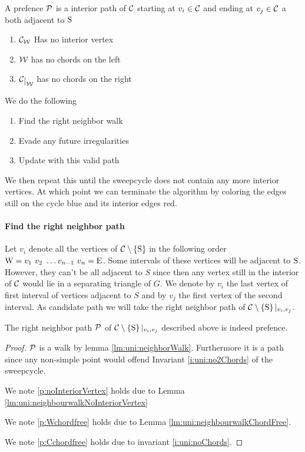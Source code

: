   \begin{defi}[Prefence]
    A prefence $\P$ is a interior path of $\C$ starting at $v_i \in \C$ and ending at $v_j \in \C$ a both adjacent to $\pS$
    \begin{enumerate}
      \itemsep=-4pt
      \renewcommand*{\labelenumi}{(P\arabic{enumi})}%
      \renewcommand*{\theenumi}{(P\arabic{enumi})}%

      \item  $\C_\W$ Has no interior vertex
      \label{p:noInteriorVertex}
      \item  $\W$ has no chords on the left     \label{p:Wchordfree}
      \item  $\restC{\W}$ has no chords on the right     \label{p:Cchordfree}
    \end{enumerate}
  \end{defi}

  We do the following
  \begin{enumerate}
    \itemsep=-4pt
    \item Find the right neighbor walk
    \item Evade any future irregularities
    \item Update with this valid path
  \end{enumerate}

  We then repeat this until the sweepcycle does not contain any more interior vertices. At which point we can terminate the algorithm by coloring the edges still on the cycle blue and its interior edges red.

  \paragraph{Find the right neighbor path}
    Let $v_i$ denote all the vertices of $\cpath$ in the following order $\pW =  v_1 \  v_2 \  \ldots v_{n-1} \  v_n = \pE$.
    Some intervals of these vertices will be adjacent to $\pS$. However, they can't be all adjacent to $S$ since then any vertex still in the interior of $\C$ would lie in a separating triangle of $G$. We denote by $v_i$ the last vertex of first interval of vertices adjacent to $S$ and by $v_j$ the first vertex of the second interval.
    As candidate path we will take the right neighbor path of $\cpath|_{v_i, v_j}$.

    \begin{lemma}
      \label{lm:uni:isPrefence}
      The right neighbor path $\P$ of $\cpath|_{v_i, v_j}$ described above is indeed prefence.
    \end{lemma}
    \begin{proof}
      $\P$ is a walk by lemma \ref{lm:uni:neighborWalk}. Furthermore it is a path since any non-simple point would offend Invariant \ref{i:uni:no2Chords} of the sweepcycle.


      We note \ref{p:noInteriorVertex} holds due to Lemma \ref{lm:uni:neighbourwalkNoInteriorVertex}

      We note \ref{p:Wchordfree} holds due to Lemma \ref{lm:uni:neighbourwalkChordFree}.

      We note \ref{p:Cchordfree} holds due to invariant \ref{i:uni:noChords}.
    \end{proof}


